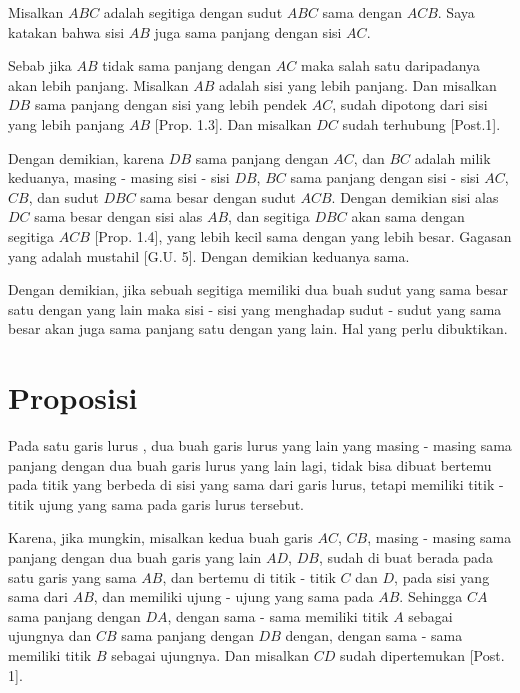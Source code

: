 \documentclass[a4paper]{book}
\begin{document}
Misalkan $ABC$ adalah segitiga dengan sudut $ABC$ sama dengan $ACB$. Saya 
katakan bahwa sisi $AB$ juga sama panjang dengan sisi $AC$.

Sebab jika $AB$ tidak sama panjang dengan $AC$ maka salah satu daripadanya
akan lebih panjang. Misalkan $AB$ adalah sisi yang lebih panjang. Dan 
misalkan $DB$ sama panjang dengan sisi yang lebih pendek $AC$, sudah dipotong
dari sisi yang lebih panjang $AB$ [Prop. 1.3]. Dan misalkan $DC$ sudah
terhubung [Post.1].

Dengan demikian, karena $DB$ sama panjang dengan $AC$, dan $BC$ adalah milik
keduanya, masing - masing sisi - sisi $DB$, $BC$ sama panjang dengan sisi - sisi
$AC$, $CB$, dan sudut $DBC$ sama besar dengan sudut $ACB$.
Dengan demikian sisi alas $DC$ sama besar dengan sisi alas $AB$, dan segitiga
$DBC$ akan sama dengan segitiga $ACB$ [Prop. 1.4], yang lebih kecil sama
dengan yang lebih besar. Gagasan yang adalah mustahil [G.U. 5].
Dengan demikian keduanya sama.

Dengan demikian, jika sebuah segitiga memiliki dua buah sudut yang sama besar
satu dengan yang lain maka sisi - sisi yang menghadap sudut - sudut yang sama
besar akan juga sama panjang satu dengan yang lain. Hal yang perlu dibuktikan.

\section*{\centering Proposisi \thesection} 
Pada satu garis lurus , dua buah garis lurus yang lain yang masing - masing 
sama panjang dengan dua buah garis lurus yang lain lagi, tidak bisa dibuat 
bertemu pada titik yang berbeda di sisi yang sama dari garis lurus, tetapi
memiliki titik - titik ujung yang sama pada garis lurus tersebut.
\begin{center}
\end{center}
Karena, jika mungkin, misalkan kedua buah garis $AC$, $CB$, masing - masing 
sama panjang dengan dua buah garis yang lain $AD$, $DB$, sudah di buat berada
pada satu garis yang sama $AB$, dan bertemu di titik - titik $C$ dan $D$, pada
sisi yang sama dari $AB$, dan memiliki ujung - ujung yang sama pada $AB$. 
Sehingga $CA$ sama panjang dengan $DA$, dengan sama - sama memiliki titik $A$ 
sebagai ujungnya dan $CB$ sama panjang dengan $DB$ dengan, dengan sama - sama
memiliki titik $B$ sebagai ujungnya. Dan misalkan $CD$ sudah dipertemukan 
[Post. 1].  
\end{document}

